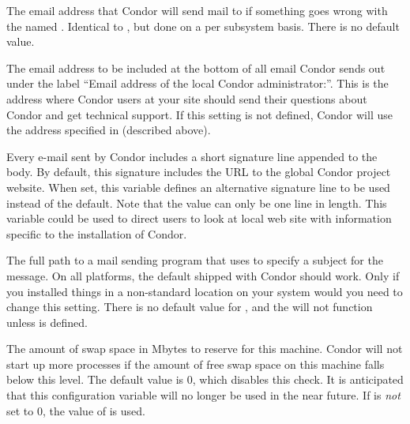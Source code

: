 \begin{description}
\label{param:SubsysAdminEmail}
\item[\MacroB{<SUBSYS>\_ADMIN\_EMAIL}]
  The email address that Condor will send mail to if something goes wrong
  with the named .  Identical to ,
  but done on a per subsystem basis. There is no default value.
  
\label{param:CondorSupportEmail}
\item[\Macro{CONDOR\_SUPPORT\_EMAIL}]
  The email address to be included at the bottom of all email Condor
  sends out under the label ``Email address of the local Condor
  administrator:''.  
  This is the address where Condor users at your site should send
  their questions about Condor and get technical support.
  If this setting is not defined, Condor will use the address
  specified in  (described above).

\label{param:EmailSignature}
\item[\Macro{EMAIL\_SIGNATURE}]
  Every e-mail sent by Condor includes a short signature line appended
  to the body.  By default, this signature includes the URL to the
  global Condor project website.  
  When set, this variable defines an alternative signature line to be
  used instead of the default. 
  Note that the value can only be one line in length.
  This variable could be used to direct users
  to look at local web site with information specific to the installation
  of Condor.

\label{param:Mail}
\item[\Macro{MAIL}]
  The full path to a mail
  sending program that uses  to specify a subject for the
  message.  On all platforms, the default shipped with Condor should
  work.  Only if you installed things in a non-standard location on
  your system would you need to change this setting.  There is no
  default value for , and the  will not
  function unless  is defined.

\label{param:ReservedSwap}
\item[\Macro{RESERVED\_SWAP}]
  The amount of swap space in Mbytes to reserve for this machine.
  Condor will not start up more  processes if the
  amount of free swap space on this machine falls below this level.
  The default value is 0, which disables this check.
  It is anticipated that this configuration variable will no longer
  be used in the near future.
  If  is \emph{not} set to 0,
  the value of  is used.


\end{description}
